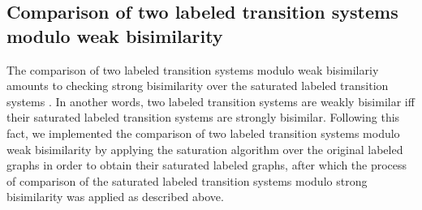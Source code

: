 \subsection{Comparison of two labeled transition systems modulo weak bisimilarity}
The comparison of two labeled transition systems modulo weak bisimilariy amounts to checking strong bisimilarity over the saturated labeled transition systems \cite{ReactiveSystems}. In another words, two labeled transition systems are weakly bisimilar iff their saturated labeled transition systems are strongly bisimilar. Following this fact, we implemented the comparison of two labeled transition systems modulo weak bisimilarity by applying the saturation algorithm over the original labeled graphs in order to obtain their saturated labeled graphs, after which the process of comparison of the saturated labeled transition systems modulo strong bisimilarity was applied as described above.
\\